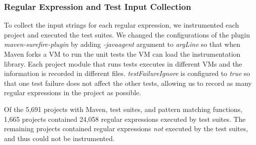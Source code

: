 \subsubsection{Regular Expression and Test Input Collection}
To collect the input strings for each regular expression, we instrumented each project and executed the test suites. 
We changed the configurations of the plugin \emph{maven-surefire-plugin}  by adding {\em -javaagent} argument to {\em argLine} so that when Maven forks a VM to run the unit tests the VM can load the instrumentation library. 
Each project module that runs tests executes in different VMs and the information is recorded in different files. {\em testFailureIgnore} is configured to {\em true} so that one test failure does not affect the other tests, allowing us to record as many regular expressions in the project as possible.

Of the 5,691 projects with Maven, test suites, and pattern matching functions, 1,665 projects contained 24,058 regular expressions executed by test suites. The remaining projects contained regular expressions \emph{not} executed by the test suites, and thus could not be instrumented. 



